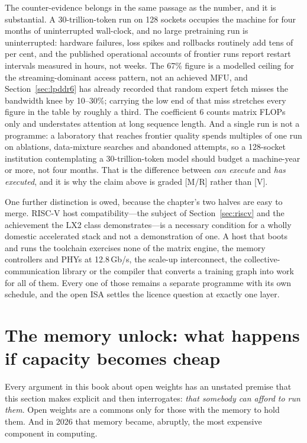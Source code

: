 The counter-evidence belongs in the same passage as the number, and it is substantial. A 30-trillion-token run on 128 sockets occupies the machine for four months of uninterrupted wall-clock, and no large pretraining run is uninterrupted: hardware failures, loss spikes and rollbacks routinely add tens of per cent, and the published operational accounts of frontier runs report restart intervals measured in hours, not weeks. The 67\% figure is a modelled ceiling for the streaming-dominant access pattern, not an achieved MFU, and Section~\ref{sec:lpddr6} has already recorded that random expert fetch misses the bandwidth knee by 10--30\%; carrying the low end of that miss stretches every figure in the table by roughly a third. The coefficient 6 counts matrix FLOPs only and understates attention at long sequence length. And a single run is not a programme: a laboratory that reaches frontier quality spends multiples of one run on ablations, data-mixture searches and abandoned attempts, so a 128-socket institution contemplating a 30-trillion-token model should budget a machine-year or more, not four months. That is the difference between \emph{can execute} and \emph{has executed}, and it is why the claim above is graded [M/R] rather than [V].

One further distinction is owed, because the chapter's two halves are easy to merge. RISC-V host compatibility---the subject of Section~\ref{sec:riscv} and the achievement the LX2 class demonstrates---is a necessary condition for a wholly domestic accelerated stack and not a demonstration of one. A host that boots and runs the toolchain exercises none of the matrix engine, the memory controllers and PHYs at 12.8\,Gb/s, the scale-up interconnect, the collective-communication library or the compiler that converts a training graph into work for all of them. Every one of those remains a separate programme with its own schedule, and the open ISA settles the licence question at exactly one layer.

\section{The memory unlock: what happens if capacity becomes cheap}
\label{sec:memoryunlock}

Every argument in this book about open weights has an unstated premise that this section makes explicit and then interrogates: \emph{that somebody can afford to run them}. Open weights are a commons only for those with the memory to hold them. And in 2026 that memory became, abruptly, the most expensive component in computing.

